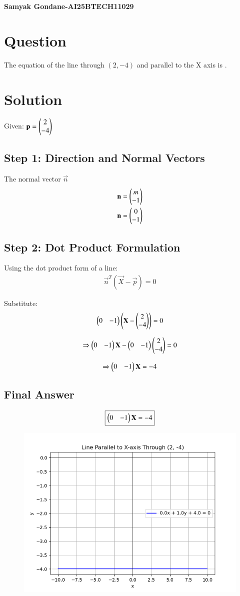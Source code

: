 \documentclass{article}
\begin{document}
\begin{center}
\large
    \textbf{Samyak Gondane-AI25BTECH11029}
\end{center}
\date{}

\section*{Question}
The equation of the line through $(2, -4)$ and parallel to the X axis is \underline{\hspace{2 cm}}.

\section*{Solution}
Given: $\mathbf{p} = \begin{pmatrix}2 \\ -4\end{pmatrix}$

\subsection*{Step 1: Direction and Normal Vectors}
The normal vector $\vec{n}$
\begin{align}
\mathbf{n} = \begin{pmatrix}m \\ -1\end{pmatrix}\\
\mathbf{n} = \begin{pmatrix}0 \\ -1\end{pmatrix}
\end{align}

\subsection*{Step 2: Dot Product Formulation}
Using the dot product form of a line:
\begin{align}
\vec{n}^T (\vec{X} - \vec{p}) = 0
\end{align}

Substitute:
\begin{align}
\begin{pmatrix}0 & -1\end{pmatrix} \begin{pmatrix}\mathbf{X} - \begin{pmatrix}2 \\ -4\end{pmatrix}\end{pmatrix} = 0
\end{align}

\begin{align}
\Rightarrow \begin{pmatrix}0 & -1\end{pmatrix}\mathbf{X} - \begin{pmatrix}0 & -1\end{pmatrix}\begin{pmatrix}2 \\ -4\end{pmatrix} = 0
\end{align}

\begin{align}
\Rightarrow \begin{pmatrix}0 & -1\end{pmatrix}\mathbf{X} = -4
\end{align}


\subsection*{Final Answer}
\begin{align}
\boxed{\begin{pmatrix}0 & -1\end{pmatrix}\mathbf{X} = -4}
\end{align}

\begin{figure}[H]
    \centering
    \includegraphics[width=0.5\linewidth]{./figs/Figure_1.png}
    \caption{}
    \label{fig:fig1}
\end{figure}
\end{document}
